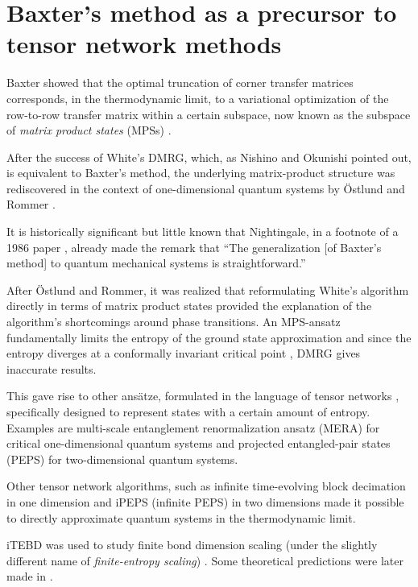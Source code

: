 \section{Baxter's method as a precursor to tensor network methods}

Baxter showed that the optimal truncation of corner transfer matrices
corresponds, in the thermodynamic limit, to a variational optimization of
the row-to-row transfer matrix within a certain subspace, now known as the
subspace of \emph{matrix product states} (MPSs) \cite{baxter1968dimers,
baxter1982exactly_ctm}.

After the success of White's DMRG, which, as Nishino and Okunishi pointed out, is equivalent
to Baxter's method, the underlying matrix-product structure was rediscovered in
the context of one-dimensional quantum systems by Östlund and Rommer
\cite{ostlund1995thermodynamic, rommer1997class}.

It is historically significant but little known that Nightingale, in
a footnote of a 1986 paper \cite{nightingale1986gap}, already made the
remark that \enquote{The generalization [of Baxter's method] to quantum
mechanical systems is straightforward.}

After Östlund and Rommer, it was realized that reformulating White's
algorithm directly in terms of matrix product states provided the
explanation of the algorithm's shortcomings around phase transitions. An
MPS-ansatz fundamentally limits the entropy of the ground state
approximation and since the entropy diverges at a conformally invariant
critical point \cite{calabrese2004entanglement}, DMRG gives inaccurate
results.

This gave rise to other ansätze, formulated in the language of tensor
networks \cite{orus2014practical}, specifically designed to represent
states with a certain amount of entropy. Examples are multi-scale
entanglement renormalization ansatz (MERA) for critical one-dimensional
quantum systems \cite{vidal2007entanglement} and projected entangled-pair
states (PEPS) \cite{verstraete2004renormalization}
for two-dimensional quantum systems.

Other tensor network algorithms, such as infinite time-evolving block
decimation \cite{vidal2007classical} in one dimension and iPEPS (infinite
PEPS) \cite{jordan2008classical} in two dimensions made it possible to
directly approximate quantum systems in the thermodynamic limit.

iTEBD was used to study finite bond dimension scaling (under the slightly
different name of \emph{finite-entropy scaling})
\cite{tagliacozzo2008scaling}. Some theoretical predictions were later
made in \cite{pollmann2009theory}.

